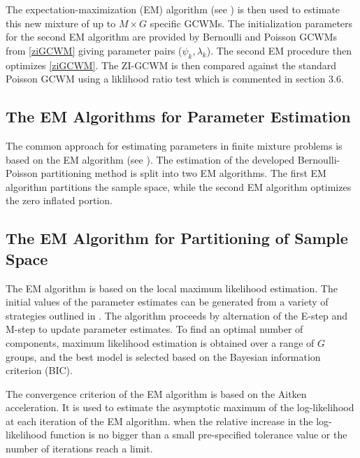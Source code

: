 \documentclass[11pt,letterpaper]{article}
\numberwithin{equation}{section}
\numberwithin{equation}{section}
\numberwithin{equation}{section}
\begin{document}
The expectation-maximization (EM) algorithm (see \cite{Dempster+Laird+Rubin:1977}) is then used to estimate this new mixture of up to $M \times G$ specific GCWMs. The initialization parameters for the second EM algorithm are provided by Bernoulli and Poisson GCWMs from \eqref{ziGCWM} giving parameter pairs ($ \psi_k,\lambda_k  $). The second EM procedure then optimizes \eqref{ziGCWM}. The ZI-GCWM is then compared against the standard Poisson GCWM using a liklihood ratio test which is commented in section 3.6.

\subsection{The EM Algorithms for Parameter Estimation}
The common approach for estimating parameters in finite mixture problems is based on the EM algorithm (see \cite{McLachlan+Peel:2000}).
The estimation of the developed Bernoulli-Poisson partitioning method is split into two EM algorithms. The first EM algorithm partitions the sample space, while the second EM algorithm optimizes the zero inflated portion.
 \subsection{The EM Algorithm for Partitioning of Sample Space}

The EM algorithm is based on the local  maximum likelihood estimation. %
The initial values of the parameter estimates can be generated from a variety of strategies outlined in \cite{initialPaperGrassiaRef}. %
 The algorithm proceeds by alternation of the E-step and M-step to update parameter estimates. %
To find an optimal number of components, maximum likelihood estimation is obtained over a range of $G$ groups, and the best model is selected based on the Bayesian information criterion (BIC).   %

The convergence criterion of the EM algorithm is based on the Aitken acceleration. It is used to estimate the asymptotic maximum of the log-likelihood at each iteration of the EM algorithm.  when the relative increase in the log-likelihood function is no bigger than a small pre-specified tolerance value or the number of iterations reach a limit. %
\end{document}
